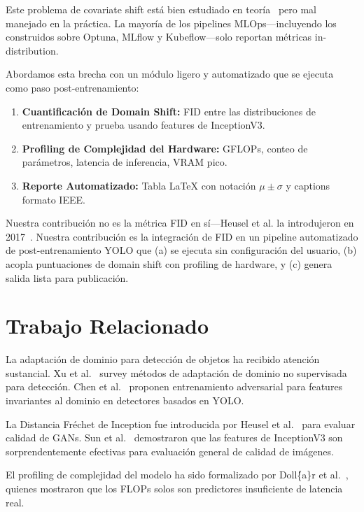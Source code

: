 \documentclass[10pt,twocolumn,letterpaper]{article}
\begin{document}
Este problema de covariate shift está bien estudiado en teoría~\cite{bendavid2010theory} pero mal manejado en la práctica. La mayoría de los pipelines MLOps---incluyendo los construidos sobre Optuna, MLflow y Kubeflow---solo reportan métricas in-distribution.

Abordamos esta brecha con un módulo ligero y automatizado que se ejecuta como paso post-entrenamiento:

\begin{enumerate}
    \item \textbf{Cuantificación de Domain Shift:} FID entre las distribuciones de entrenamiento y prueba usando features de InceptionV3.
    \item \textbf{Profiling de Complejidad del Hardware:} GFLOPs, conteo de parámetros, latencia de inferencia, VRAM pico.
    \item \textbf{Reporte Automatizado:} Tabla LaTeX con notación $\mu \pm \sigma$ y captions formato IEEE.
\end{enumerate}

Nuestra contribución no es la métrica FID en sí---Heusel et al. la introdujeron en 2017~\cite{heusel2017gans}. Nuestra contribución es la integración de FID en un pipeline automatizado de post-entrenamiento YOLO que (a) se ejecuta sin configuración del usuario, (b) acopla puntuaciones de domain shift con profiling de hardware, y (c) genera salida lista para publicación.

\section{Trabajo Relacionado}
La adaptación de dominio para detección de objetos ha recibido atención sustancial. Xu et al.~\cite{xu2020domain} survey métodos de adaptación de dominio no supervisada para detección. Chen et al.~\cite{chen2022domain} proponen entrenamiento adversarial para features invariantes al dominio en detectores basados en YOLO.

La Distancia Fréchet de Inception fue introducida por Heusel et al.~\cite{heusel2017gans} para evaluar calidad de GANs. Sun et al.~\cite{sun2017revisiting} demostraron que las features de InceptionV3 son sorprendentemente efectivas para evaluación general de calidad de imágenes.

El profiling de complejidad del modelo ha sido formalizado por Doll\'\{a\}r et al.~\cite{dollar2021rethinking}, quienes mostraron que los FLOPs solos son predictores insuficiente de latencia real.
\end{document}
